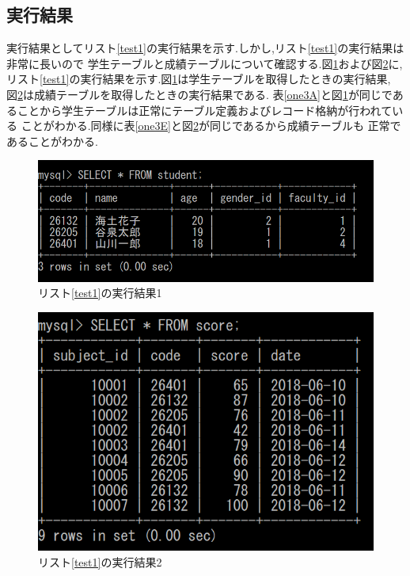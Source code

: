 \documentclass[a4j]{jarticle}
\begin{document}
    \subsection{実行結果}
    実行結果としてリスト\ref{test1}の実行結果を示す.しかし,リスト\ref{test1}の実行結果は非常に長いので
    学生テーブルと成績テーブルについて確認する.図\ref{studentphoto}および図\ref{scorephoto}に,
    リスト\ref{test1}の実行結果を示す.図\ref{studentphoto}は学生テーブルを取得したときの実行結果,
    図\ref{scorephoto}は成績テーブルを取得したときの実行結果である.
    表\ref{one3A}と図\ref{studentphoto}が同じであることから学生テーブルは正常にテーブル定義およびレコード格納が行われている
    ことがわかる.同様に表\ref{one3E}と図\ref{scorephoto}が同じであるから成績テーブルも
    正常であることがわかる.

    \begin{figure}[H]
      \centering
      \includegraphics[scale=0.7]{student.png}
      \caption{リスト\ref{test1}の実行結果1}
       \label{studentphoto}
      \end{figure}

      \begin{figure}[H]
        \centering
        \includegraphics[scale=0.7]{score.png}
        \caption{リスト\ref{test1}の実行結果2}
         \label{scorephoto}
        \end{figure}
\end{document}
